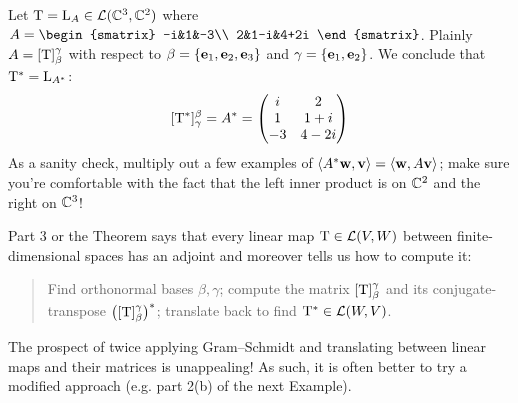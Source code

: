 \begin{example}{}{}
	Let $\mathrm{T}=\mathrm{L}_A\in\mathcal{L}(\mathbb{C}^3,\mathbb{C}^2)$ where $A=\begin{smatrix}
	  -i&1&-3\\
	  2&1-i&4+2i
	\end{smatrix}$.\smallbreak
	Plainly $A=[\mathrm{T}]_\beta^\gamma$ with respect to $\beta=\{{\mathbf{e}}_1,{\mathbf{e}}_2,{\mathbf{e}}_3\}$ and $\gamma=\{{\mathbf{e}}_1,{\mathbf{e}}_2\}$. We conclude that $\mathrm{T}^*=\mathrm{L}_{A^*}$:
	\[
	[\mathrm{T}^*]_\gamma^\beta=A^*=
	\begin{pmatrix}
	  i&2\\
	  1&1+i\\
	  -3&4-2i
	\end{pmatrix}
	\]
	As a sanity check, multiply out a few examples of $\left\langle A^*{\mathbf{w}},{\mathbf{v}}\right\rangle=\left\langle {\mathbf{w}},A{\mathbf{v}}\right\rangle$; make sure you're comfortable with the fact that the left inner product is on $\mathbb{C}^2$ and the right on $\mathbb{C}^3$!
\end{example}

Part 3 or the Theorem says that every linear map $\mathrm{T}\in\mathcal{L}(V,W)$ between finite-dimensional spaces has an adjoint and moreover tells us how to compute it:
\begin{quote} 
  Find orthonormal bases $\beta,\gamma$; compute the matrix $[\mathrm{T}]_\beta^\gamma$ and its conjugate-transpose $\bigl([\mathrm{T}]_\beta^\gamma\bigr)^*$; translate back to find $\mathrm{T}^*\in\mathcal{L}(W,V)$.
\end{quote}
The prospect of twice applying Gram--Schmidt and translating between linear maps and their matrices is unappealing! As such, it is often better to try a modified approach (e.g. part 2(b) of the next Example).


\pagebreak[3]


